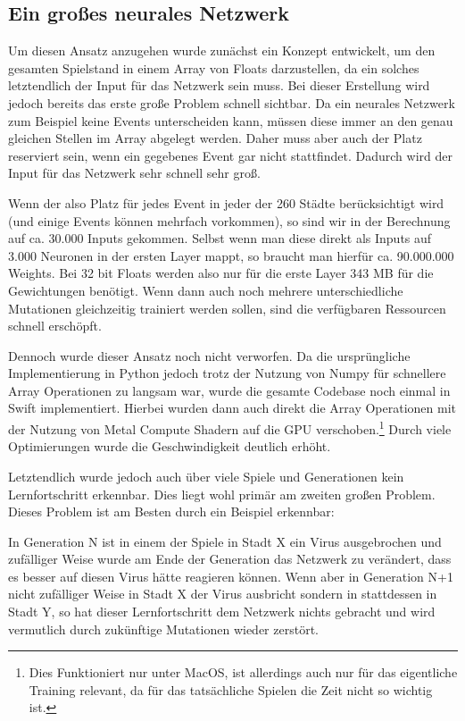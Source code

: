 \documentclass[11pt, twocolumn]{article}
\begin{document}
\subsection{Ein großes neurales Netzwerk}
Um diesen Ansatz anzugehen wurde zunächst ein Konzept entwickelt, um den gesamten Spielstand in einem Array von Floats darzustellen, da ein solches letztendlich der Input für das Netzwerk sein muss. Bei dieser Erstellung wird jedoch bereits das erste große Problem schnell sichtbar. Da ein neurales Netzwerk zum Beispiel keine Events unterscheiden kann, müssen diese immer an den genau gleichen Stellen im Array abgelegt werden. Daher muss aber auch der Platz reserviert sein, wenn ein gegebenes Event gar nicht stattfindet. Dadurch wird der Input für das Netzwerk sehr schnell sehr groß.

Wenn der also Platz für jedes Event in jeder der 260 Städte berücksichtigt wird (und einige Events können mehrfach vorkommen), so sind wir in der Berechnung auf ca. 30.000 Inputs gekommen. Selbst wenn man diese direkt als Inputs auf 3.000 Neuronen in der ersten Layer mappt, so braucht man hierfür ca. 90.000.000 Weights. Bei 32 bit Floats werden also nur für die erste Layer 343 MB für die Gewichtungen benötigt. Wenn dann auch noch mehrere unterschiedliche Mutationen gleichzeitig trainiert werden sollen, sind die verfügbaren Ressourcen schnell erschöpft.

Dennoch wurde dieser Ansatz noch nicht verworfen. Da die ursprüngliche Implementierung in Python jedoch trotz der Nutzung von Numpy für schnellere Array Operationen zu langsam war, wurde die gesamte Codebase noch einmal in Swift implementiert. Hierbei wurden dann auch direkt die Array Operationen mit der Nutzung von Metal Compute Shadern auf die GPU verschoben.\footnote{Dies Funktioniert nur unter MacOS, ist allerdings auch nur für das eigentliche Training relevant, da für das tatsächliche Spielen die Zeit nicht so wichtig ist.}  Durch viele Optimierungen wurde die Geschwindigkeit deutlich erhöht. 

Letztendlich wurde jedoch auch über viele Spiele und Generationen kein Lernfortschritt erkennbar. Dies liegt wohl primär am zweiten großen Problem. Dieses Problem ist am Besten durch ein Beispiel erkennbar:

In Generation N ist in einem der Spiele in Stadt X ein Virus ausgebrochen und zufälliger Weise wurde am Ende der Generation das Netzwerk zu verändert, dass es besser auf diesen Virus hätte reagieren können. Wenn aber in Generation N+1 nicht zufälliger Weise in Stadt X der Virus ausbricht sondern in stattdessen in Stadt Y, so hat dieser Lernfortschritt dem Netzwerk nichts gebracht und wird vermutlich durch zukünftige Mutationen wieder zerstört.
\end{document}
